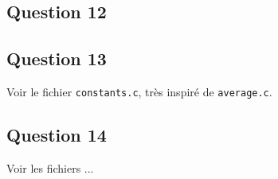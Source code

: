 \documentclass{article}
\begin{document}
\subsection*{Question 12}


\subsection*{Question 13}

Voir le fichier \texttt{constants.c}, très inspiré de \texttt{average.c}.

\subsection*{Question 14}

Voir les fichiers ... %
\end{document}
